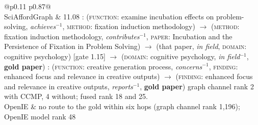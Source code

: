 \begin{table}[H]
\centering
\resulttablestyle
\setlength{\tabcolsep}{5pt}
\renewcommand{\arraystretch}{1.25}
\begin{tabular}{@{}p{0.11\linewidth} p{0.87\linewidth}@{}}
\toprule
{} \\
\midrule
SciAfford\-Graph &
11.08 :\; (\textsc{function}: examine incubation effects on problem-solving,\; \textit{achieves}$^{-1}$,\;
\textsc{method}: fixation induction methodology) $\rightarrow$
(\textsc{method}: fixation induction methodology,\; \textit{contributes}$^{-1}$,\;
\textsc{paper}: Incubation and the Persistence of Fixation in Problem Solving) $\rightarrow$
(that paper,\; \textit{in field},\; \textsc{domain}: cognitive psychology)\; {\scriptsize [gate 1.15]} $\rightarrow$
(\textsc{domain}: cognitive psychology,\; \textit{in field}$^{-1}$,\; \textbf{gold paper})  :\; (\textsc{function}: creative generation process,\; \textit{concerns}$^{-1}$,\;
\textsc{finding}: enhanced focus and relevance in creative outputs) $\rightarrow$
(\textsc{finding}: enhanced focus and relevance in creative outputs,\; \textit{reports}$^{-1}$,\; \textbf{gold paper}) \newline
{\footnotesize graph channel rank 2 with CCMP, 4 without; fused rank 18 and 25.} \\
OpenIE &
no route to the gold within six hops (graph channel rank 1{,}196); OpenIE model rank 48 \\
\bottomrule
\end{tabular}
\caption{Path interpretations for Figure~\ref{fig:qual-cs-2}. Top-weighted routes from the query's seed frames to the gold under the trained reasoner (beam search over the gradient of the graph score with respect to each layer's edge weights, as in NBFNet and GFM-RAG); $r^{-1}$ is the inverse relation; the CCMP gate on every hop is 1.00 except where shown. Grey weights are the same weights with the CCMP gate switched off. The routes are identical; CCMP amplifies the hop into the \textsc{domain} node (gate 1.15), concentrates the score on the top route (its share of the top-two weight rises from 0.73 to 0.75) and moves the gold from 4 to 2 in the graph channel and from 25 to 18 fused. The OpenIE entity graph has no route to this paper.}
\label{tab:paths-cs-2}
\end{table}
\clearpage
